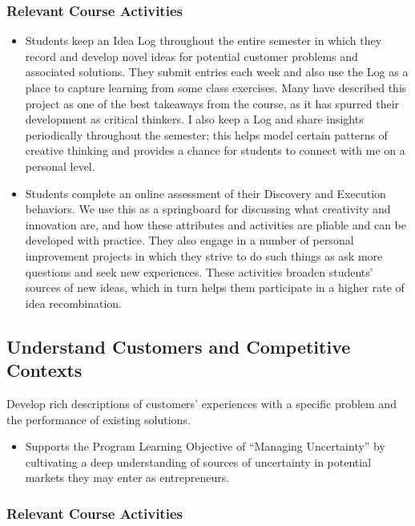 \documentclass[11pt,article,oneside]{memoir}
\begin{document}
\subsubsection{Relevant Course
Activities}\label{relevant-course-activities}

\begin{itemize}
\tightlist
\item
  Students keep an Idea Log throughout the entire semester in which they
  record and develop novel ideas for potential customer problems and
  associated solutions. They submit entries each week and also use the
  Log as a place to capture learning from some class exercises. Many
  have described this project as one of the best takeaways from the
  course, as it has spurred their development as critical thinkers. I
  also keep a Log and share insights periodically throughout the
  semester; this helps model certain patterns of creative thinking and
  provides a chance for students to connect with me on a personal level.
\item
  Students complete an online assessment of their Discovery and
  Execution behaviors. We use this as a springboard for discussing what
  creativity and innovation are, and how these attributes and activities
  are pliable and can be developed with practice. They also engage in a
  number of personal improvement projects in which they strive to do
  such things as ask more questions and seek new experiences. These
  activities broaden students' sources of new ideas, which in turn helps
  them participate in a higher rate of idea recombination.
\end{itemize}

\subsection{Understand Customers and Competitive
Contexts}\label{understand-customers-and-competitive-contexts}

Develop rich descriptions of customers' experiences with a specific
problem and the performance of existing solutions.

\begin{itemize}
\tightlist
\item
  Supports the Program Learning Objective of \enquote{Managing
  Uncertainty} by cultivating a deep understanding of sources of
  uncertainty in potential markets they may enter as entrepreneurs.
\end{itemize}

\subsubsection{Relevant Course
Activities}\label{relevant-course-activities-1}
\end{document}
